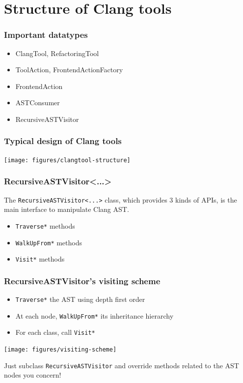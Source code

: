 \documentclass[]{beamer}
\begin{document}

\section{Structure of Clang tools}
\frame{\tableofcontents[currentsection]}
\begin{frame}
  \frametitle{Important datatypes}
  \begin{itemize}
    \item ClangTool, RefactoringTool
    \item ToolAction, FrontendActionFactory
    \item FrontendAction
    \item ASTConsumer
    \item RecursiveASTVisitor
  \end{itemize}
\end{frame}

\begin{frame}
  \frametitle{Typical design of Clang tools}
  \centerline{\texttt{[image: figures/clangtool-structure]}}
\end{frame}

\begin{frame}
  \frametitle{RecursiveASTVisitor<...>}
  The \texttt{RecursiveASTVisitor<...>} class, which provides 3 kinds of APIs,
  is the main interface to manipulate Clang AST.
  \begin{itemize}
    \item \texttt{Traverse*} methods
    \item \texttt{WalkUpFrom*} methods
    \item \texttt{Visit*} methods
  \end{itemize}
\end{frame}

\begin{frame}
  \frametitle{RecursiveASTVisitor's visiting scheme}
  \begin{itemize}
    \item \texttt{Traverse*} the AST using depth first order
    \item At each node, \texttt{WalkUpFrom*} its inheritance hierarchy
    \item For each class, call \texttt{Visit*}
  \end{itemize}
  \pause
    \centerline{\texttt{[image: figures/visiting-scheme]}}
  \pause
  \alert{Just subclass \texttt{RecursiveASTVisitor}
    and override methods related to the AST nodes you concern!}
\end{frame}
\end{document}
